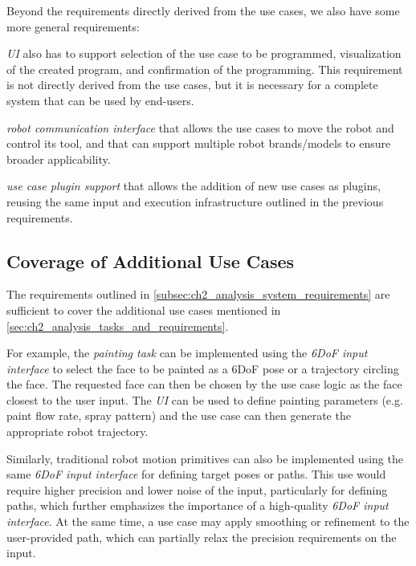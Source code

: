 Beyond the requirements directly derived from the use cases, we also have some more general requirements:
\begin{requirements}[resume]
    \item \emph{UI} also has to support selection of the use case to be programmed, visualization of the created program, and confirmation of the programming. This requirement is not directly derived from the use cases, but it is necessary for a complete system that can be used by end-users. \label{req:ui_use_case_selection}
    \item \emph{robot communication interface} that allows the use cases to move the robot and control its tool, and that can support multiple robot brands/models to ensure broader applicability. \label{req:robot_communication_interface}
    \item \emph{use case plugin support} that allows the addition of new use cases as plugins, reusing the same input and execution infrastructure outlined in the previous requirements. \label{req:use_case_plugin_support}
\end{requirements}

\subsection{Coverage of Additional Use Cases}

The requirements outlined in \autoref{subsec:ch2_analysis_system_requirements} are sufficient to cover the additional use cases mentioned in \autoref{sec:ch2_analysis_tasks_and_requirements}. 

For example, the \emph{painting task} can be implemented using the \emph{6DoF input interface} to select the face to be painted as a 6DoF pose or a trajectory circling the face. The requested face can then be chosen by the use case logic as the face closest to the user input. The \emph{UI} can be used to define painting parameters (e.g. paint flow rate, spray pattern) and the use case can then generate the appropriate robot trajectory.

Similarly, traditional robot motion primitives can also be implemented using the same \emph{6DoF input interface} for defining target poses or paths. This use would require higher precision and lower noise of the input, particularly for defining paths, which further emphasizes the importance of a high-quality \emph{6DoF input interface}. At the same time, a use case may apply smoothing or refinement to the user-provided path, which can partially relax the precision requirements on the input.

